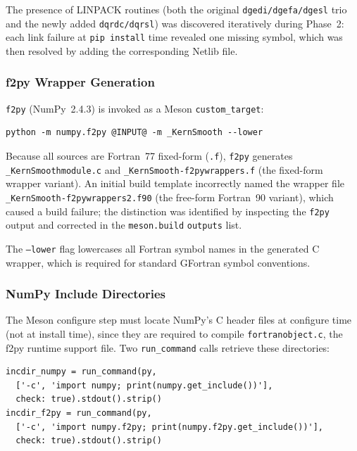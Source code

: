 \documentclass[12pt,a4paper]{article}
\begin{document}
The presence of LINPACK routines (both the original \texttt{dgedi/dgefa/dgesl} trio and the newly added \texttt{dqrdc/dqrsl}) was discovered iteratively during Phase~2: each link failure at \texttt{pip install} time revealed one missing symbol, which was then resolved by adding the corresponding Netlib file.

\subsubsection{f2py Wrapper Generation}

\texttt{f2py} (NumPy~2.4.3) is invoked as a Meson \texttt{custom\_target}:

\begin{lstlisting}[style=shell]
python -m numpy.f2py @INPUT@ -m _KernSmooth --lower
\end{lstlisting}

Because all sources are Fortran~77 fixed-form (\texttt{.f}), \texttt{f2py} generates \texttt{\_KernSmoothmodule.c} and \texttt{\_KernSmooth-f2pywrappers.f} (the fixed-form wrapper variant). An initial build template incorrectly named the wrapper file \texttt{\_KernSmooth-f2pywrappers2.f90} (the free-form Fortran~90 variant), which caused a build failure; the distinction was identified by inspecting the \texttt{f2py} output and corrected in the \texttt{meson.build} \texttt{outputs} list.

The \texttt{--lower} flag lowercases all Fortran symbol names in the generated C wrapper, which is required for standard GFortran symbol conventions.

\subsubsection{NumPy Include Directories}

The Meson configure step must locate NumPy's C header files at configure time (not at install time), since they are required to compile \texttt{fortranobject.c}, the f2py runtime support file. Two \texttt{run\_command} calls retrieve these directories:

\begin{lstlisting}[style=shell]
incdir_numpy = run_command(py,
  ['-c', 'import numpy; print(numpy.get_include())'],
  check: true).stdout().strip()
incdir_f2py = run_command(py,
  ['-c', 'import numpy.f2py; print(numpy.f2py.get_include())'],
  check: true).stdout().strip()
\end{lstlisting}
\end{document}
